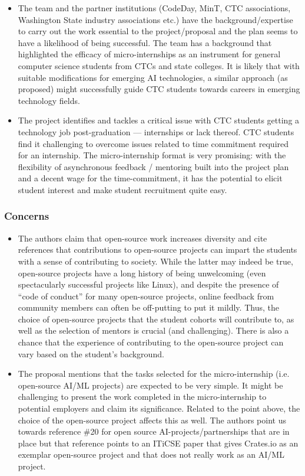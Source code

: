 \begin{itemize}
\item The team and the partner institutions (CodeDay, MinT, CTC associations, Washington State industry associations etc.) have the background/expertise to carry out the work essential to the project/proposal and the plan seems to have a likelihood of being successful. The team has a background that highlighted the efficacy of micro-internships as an instrument for general computer science students from CTCs and state colleges. It is likely that with suitable modifications for emerging AI technologies, a similar approach (as proposed) might successfully guide CTC students towards careers in emerging technology fields.

\item The project identifies and tackles a critical issue with CTC students getting a technology job post-graduation — internships or lack thereof. CTC students find it challenging to overcome issues related to time commitment required for an internship. The micro-internship format is very promising: with the flexibility of asynchronous feedback / mentoring built into the project plan and a decent wage for the time-commitment, it has the potential to elicit student interest and make student recruitment quite easy.
\end{itemize}

\subsubsection{Concerns}
\begin{itemize}
\item The authors claim that open-source work increases diversity and cite references that contributions to open-source projects can impart the students with a sense of contributing to society. While the latter may indeed be true, open-source projects have a long history of being unwelcoming (even spectacularly successful projects like Linux), and despite the presence of “code of conduct” for many open-source projects, online feedback from community members can often be off-putting to put it mildly. Thus, the choice of open-source projects that the student cohorts will contribute to, as well as the selection of mentors is crucial (and challenging). There is also a chance that the experience of contributing to the open-source project can vary based on the student’s background. 

\item The proposal mentions that the tasks selected for the micro-internship (i.e. open-source AI/ML projects) are expected to be very simple. It might be challenging to present the work completed in the micro-internship to potential employers and claim its significance. Related to the point above, the choice of the open-source project affects this as well. The authors point us towards reference \#20 for open source AI-projects/partnerships that are in place but that reference points to an ITiCSE paper that gives Crates.io as an exemplar open-source project and that does not really work as an AI/ML project.
\end{itemize}

